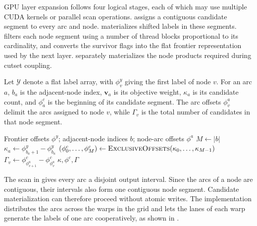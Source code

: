 \documentclass[letterpaper]{article}
\begin{document}
GPU layer expansion follows four logical stages, each of which may use multiple CUDA kernels or parallel scan operations.  assigns a contiguous candidate segment to every arc and node.  materializes shifted labels in these segments.  filters each node segment using a number of thread blocks proportional to its cardinality, and  converts the survivor flags into the flat frontier representation used by the next layer.  separately materializes the node products required during cutset coupling.

Let $\mathcal{Y}$ denote a flat label array, with $\phi^y_v$ giving the first label of node $v$. For an arc $a$, $b_a$ is the adjacent-node index, $\mathbf{v}_a$ is its objective weight, $\kappa_a$ is its candidate count, and $\phi^c_a$ is the beginning of its candidate segment. The arc offsets $\phi^a_v$ delimit the arcs assigned to node $v$, while $\Gamma_v$ is the total number of candidates in that node segment.

\begin{algorithm}[t!]
\caption{Compute GPU Candidate Offsets}
\label{alg:compute_arc_offsets}
\begin{algorithmic}[1]
\Require Frontier offsets $\phi^y$; adjacent-node indices $b$; node-arc offsets $\phi^a$
    \State $M\gets |b|$
        \State $\kappa_a\gets\phi^y_{b_a+1}-\phi^y_{b_a}$
    \EndFor
    \State $(\phi^c_0,\dots,\phi^c_M)
    \gets\Call{ExclusiveOffsets}{\kappa_0,\dots,\kappa_{M-1}}$
        \State $\Gamma_v\gets
        \phi^c_{\phi^a_{v+1}}-\phi^c_{\phi^a_v}$
    \EndFor
    \State \Return $\kappa,\phi^c,\Gamma$
\EndProcedure
\end{algorithmic}
\end{algorithm}

The scan in  gives every arc a disjoint output interval. Since the arcs of a node are contiguous, their intervals also form one contiguous node segment. Candidate materialization can therefore proceed without atomic writes. The implementation distributes the arcs across the warps in the grid and lets the lanes of each warp generate the labels of one arc cooperatively, as shown in .
\end{document}
